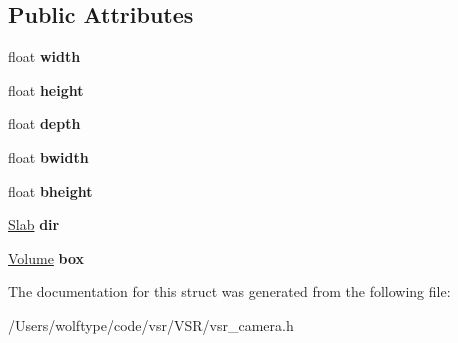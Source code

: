 \subsection*{Public Attributes}
\begin{DoxyCompactItemize}
\item 
\hypertarget{structvsr_1_1_frustrum_aba3d5ecc337fa2a069a65cc037f5bd08}{float {\bfseries width}}\label{structvsr_1_1_frustrum_aba3d5ecc337fa2a069a65cc037f5bd08}

\item 
\hypertarget{structvsr_1_1_frustrum_a3fd6fae8a55fe695f9595f924c44d274}{float {\bfseries height}}\label{structvsr_1_1_frustrum_a3fd6fae8a55fe695f9595f924c44d274}

\item 
\hypertarget{structvsr_1_1_frustrum_a44597b73eab45bd8cf9c110448dc76c4}{float {\bfseries depth}}\label{structvsr_1_1_frustrum_a44597b73eab45bd8cf9c110448dc76c4}

\item 
\hypertarget{structvsr_1_1_frustrum_a2dfbef53993bca06ba6f902800fd1741}{float {\bfseries bwidth}}\label{structvsr_1_1_frustrum_a2dfbef53993bca06ba6f902800fd1741}

\item 
\hypertarget{structvsr_1_1_frustrum_ac9d756e05741853ff0b0d4829b6d24c5}{float {\bfseries bheight}}\label{structvsr_1_1_frustrum_ac9d756e05741853ff0b0d4829b6d24c5}

\item 
\hypertarget{structvsr_1_1_frustrum_a888c41642b726fe31d54b452c6bea43b}{\hyperlink{structvsr_1_1_slab}{Slab} {\bfseries dir}}\label{structvsr_1_1_frustrum_a888c41642b726fe31d54b452c6bea43b}

\item 
\hypertarget{structvsr_1_1_frustrum_ac61f00f7c53868537f003ca747cc64f3}{\hyperlink{structvsr_1_1_volume}{Volume} {\bfseries box}}\label{structvsr_1_1_frustrum_ac61f00f7c53868537f003ca747cc64f3}

\end{DoxyCompactItemize}


The documentation for this struct was generated from the following file\-:\begin{DoxyCompactItemize}
\item 
/\-Users/wolftype/code/vsr/\-V\-S\-R/vsr\-\_\-camera.\-h\end{DoxyCompactItemize}
